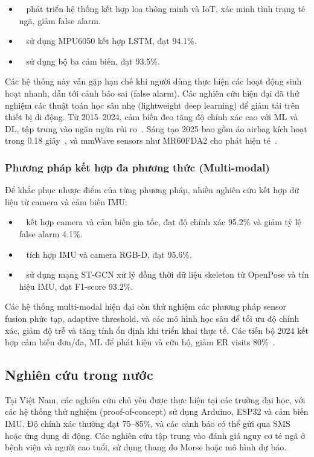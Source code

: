 \begin{itemize}
    \item ~\cite{xu2023} phát triển hệ thống kết hợp loa thông minh và IoT, xác minh tình trạng té ngã, giảm false alarm.  
    \item ~\cite{hussain2019} sử dụng MPU6050 kết hợp LSTM, đạt 94.1\%.  
    \item ~\cite{alarifi2021} sử dụng bộ ba cảm biến, đạt 93.5\%.  
\end{itemize}

Các hệ thống này vẫn gặp hạn chế khi người dùng thực hiện các hoạt động sinh hoạt nhanh, dẫn tới cảnh báo sai (false alarm). Các nghiên cứu hiện đại đã thử nghiệm các thuật toán học sâu nhẹ (lightweight deep learning) để giảm tải trên thiết bị di động. Từ 2015--2024, cảm biến đeo tăng độ chính xác cao với ML và DL, tập trung vào ngăn ngừa rủi ro~\cite{wearable20152024}. Sáng tạo 2025 bao gồm áo airbag kích hoạt trong 0.18 giây~\cite{airbag2025}, và mmWave sensors như MR60FDA2 cho phát hiện té~\cite{mmwave2025}.

\subsubsection{Phương pháp kết hợp đa phương thức (Multi-modal)}
Để khắc phục nhược điểm của từng phương pháp, nhiều nghiên cứu kết hợp dữ liệu từ camera và cảm biến IMU:

\begin{itemize}
    \item ~\cite{rougier2011} kết hợp camera và cảm biến gia tốc, đạt độ chính xác 95.2\% và giảm tỷ lệ false alarm 4.1\%.  
    \item ~\cite{liu2018} tích hợp IMU và camera RGB-D, đạt 95.6\%.  
    \item ~\cite{keskes2021} sử dụng mạng ST-GCN xử lý đồng thời dữ liệu skeleton từ OpenPose và tín hiệu IMU, đạt F1-score 93.2\%.  
\end{itemize}

Các hệ thống multi-modal hiện đại còn thử nghiệm các phương pháp sensor fusion phức tạp, adaptive threshold, và các mô hình học sâu để tối ưu độ chính xác, giảm độ trễ và tăng tính ổn định khi triển khai thực tế. Các tiến bộ 2024 kết hợp cảm biến đơn/đa, ML để phát hiện và cứu hộ, giảm ER visits 80\%~\cite{multimodal2024}.

\subsection{Nghiên cứu trong nước}
Tại Việt Nam, các nghiên cứu chủ yếu được thực hiện tại các trường đại học, với các hệ thống thử nghiệm (proof-of-concept) sử dụng Arduino, ESP32 và cảm biến IMU. Độ chính xác thường đạt 75--85\%, và các cảnh báo có thể gửi qua SMS hoặc ứng dụng di động. Các nghiên cứu tập trung vào đánh giá nguy cơ té ngã ở bệnh viện và người cao tuổi, sử dụng thang đo Morse hoặc mô hình dự báo.

